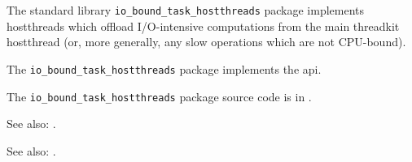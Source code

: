 
The standard library {\tt io\_bound\_task\_hostthreads} package implements hostthreads which offload 
I/O-intensive computations from the main threadkit hostthread  (or, more generally, any slow 
operations which are not CPU-bound).

The {\tt io\_bound\_task\_hostthreads} package implements the  api.

The {\tt io\_bound\_task\_hostthreads} package source code is in .

See also:   .

See also:   .

